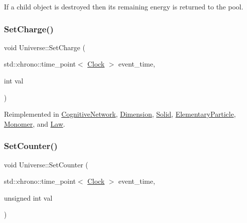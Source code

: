 If a child object is destroyed then its remaining energy is returned to the pool.\mbox{\label{classUniverse_a3b3da7c86a7b75e5e5c0b7972ac82a87}} 
\subsubsection{\texorpdfstring{Set\+Charge()}{SetCharge()}}
{\footnotesize\ttfamily void Universe\+::\+Set\+Charge (\begin{DoxyParamCaption}\item[{std\+::chrono\+::time\+\_\+point$<$ \mbox{\hyperlink{universe_8h_a0ef8d951d1ca5ab3cfaf7ab4c7a6fd80}{Clock}} $>$}]{event\+\_\+time,  }\item[{int}]{val }\end{DoxyParamCaption})\hspace{0.3cm}{\ttfamily [virtual]}}



Reimplemented in \mbox{\hyperlink{classCognitiveNetwork_a99f801aeca299186cc706696696749b1}{Cognitive\+Network}}, \mbox{\hyperlink{classDimension_a6d3f7fa4a26b92d8ae6161a1b8bb8220}{Dimension}}, \mbox{\hyperlink{classSolid_a37503e6b25f912254414e778af2e75cd}{Solid}}, \mbox{\hyperlink{classElementaryParticle_abbc6d3c58509c4121df55bfef716d2f1}{Elementary\+Particle}}, \mbox{\hyperlink{classMonomer_a1ee35c888318e590082e6cd1772bb430}{Monomer}}, and \mbox{\hyperlink{classLaw_a2e780573f6285f88d167d45a2e243d01}{Law}}.

\mbox{\label{classUniverse_aa22202ae740eb1355529afcb13285e91}} 
\subsubsection{\texorpdfstring{Set\+Counter()}{SetCounter()}}
{\footnotesize\ttfamily void Universe\+::\+Set\+Counter (\begin{DoxyParamCaption}\item[{std\+::chrono\+::time\+\_\+point$<$ \mbox{\hyperlink{universe_8h_a0ef8d951d1ca5ab3cfaf7ab4c7a6fd80}{Clock}} $>$}]{event\+\_\+time,  }\item[{unsigned int}]{val }\end{DoxyParamCaption})\hspace{0.3cm}{\ttfamily [virtual]}}



